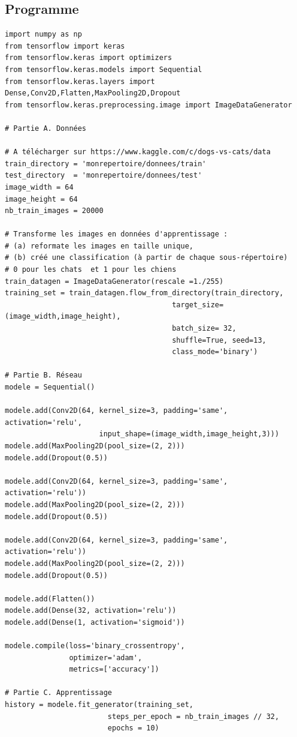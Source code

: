 \documentclass[11pt,class=report,crop=false]{standalone}
\begin{document}
\subsection{Programme}

\begin{lstlisting}
import numpy as np
from tensorflow import keras
from tensorflow.keras import optimizers
from tensorflow.keras.models import Sequential
from tensorflow.keras.layers import Dense,Conv2D,Flatten,MaxPooling2D,Dropout
from tensorflow.keras.preprocessing.image import ImageDataGenerator

# Partie A. Données

# A télécharger sur https://www.kaggle.com/c/dogs-vs-cats/data
train_directory = 'monrepertoire/donnees/train'
test_directory  = 'monrepertoire/donnees/test'
image_width = 64
image_height = 64
nb_train_images = 20000

# Transforme les images en données d'apprentissage : 
# (a) reformate les images en taille unique, 
# (b) créé une classification (à partir de chaque sous-répertoire) 
# 0 pour les chats  et 1 pour les chiens 
train_datagen = ImageDataGenerator(rescale =1./255)
training_set = train_datagen.flow_from_directory(train_directory,
                                       target_size=(image_width,image_height),
                                       batch_size= 32,
                                       shuffle=True, seed=13,
                                       class_mode='binary')

# Partie B. Réseau 
modele = Sequential()

modele.add(Conv2D(64, kernel_size=3, padding='same', activation='relu', 
                      input_shape=(image_width,image_height,3)))
modele.add(MaxPooling2D(pool_size=(2, 2)))
modele.add(Dropout(0.5))

modele.add(Conv2D(64, kernel_size=3, padding='same', activation='relu'))
modele.add(MaxPooling2D(pool_size=(2, 2)))
modele.add(Dropout(0.5))

modele.add(Conv2D(64, kernel_size=3, padding='same', activation='relu'))
modele.add(MaxPooling2D(pool_size=(2, 2)))
modele.add(Dropout(0.5))

modele.add(Flatten())
modele.add(Dense(32, activation='relu'))
modele.add(Dense(1, activation='sigmoid'))

modele.compile(loss='binary_crossentropy',
               optimizer='adam',
               metrics=['accuracy'])

# Partie C. Apprentissage
history = modele.fit_generator(training_set,
                        steps_per_epoch = nb_train_images // 32,
                        epochs = 10)

\end{lstlisting}
\end{document}
